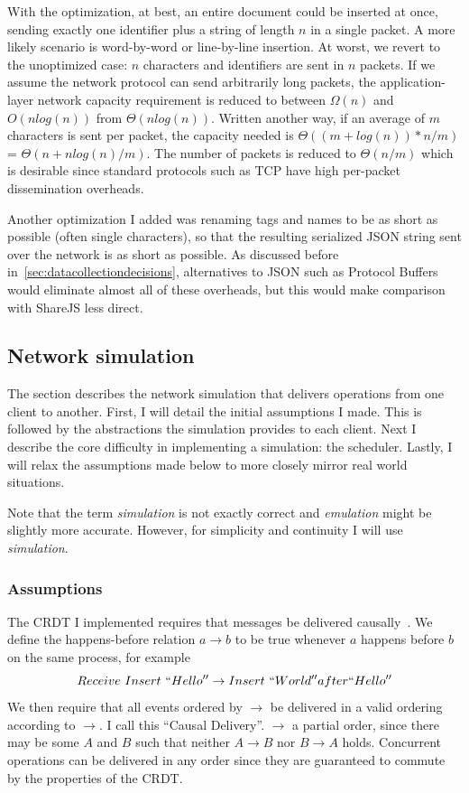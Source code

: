 \documentclass[12pt,a4paper,twoside,openright]{report}
\begin{document}
			With the optimization, at best, an entire document could be inserted at once, sending exactly one identifier plus a string of length $n$ in a single packet. A more likely scenario is word-by-word or line-by-line insertion. At worst, we revert to the unoptimized case: $n$ characters and identifiers are sent in $n$ packets. If we assume the network protocol can send arbitrarily long packets, the application-layer network capacity requirement is reduced to between $\Omega (n)$ and $O(nlog(n))$ from $\Theta(nlog(n))$. Written another way, if an average of $m$ characters is sent per packet, the capacity needed is $\Theta ((m+log(n)) * n/m)$ = $\Theta (n + nlog(n)/m)$. The number of packets is reduced to $\Theta (n/m)$ which is desirable since standard protocols such as TCP have high per-packet dissemination overheads.
			
			Another optimization I added was renaming tags and names to be as short as possible (often single characters), so that the resulting serialized JSON string sent over the network is as short as possible. As discussed before in~\cref{sec:datacollectiondecisions}, alternatives to JSON such as Protocol Buffers would eliminate almost all of these overheads, but this would make comparison with ShareJS less direct.
	
	\subsection{Network simulation}
	
		The section describes the network simulation that delivers operations from one client to another. First, I will detail the initial assumptions I made. This is followed by the abstractions the simulation provides to each client. Next I describe the core difficulty in implementing a simulation: the scheduler. Lastly, I will relax the assumptions made below to more closely mirror real world situations.
		
		Note that the term \textit{simulation} is not exactly correct and \textit{emulation} might be slightly more accurate. However, for simplicity and continuity I will use \textit{simulation}.
		
		\subsubsection{Assumptions} \label{sec:networkassumptions}
		The CRDT I implemented requires that messages be delivered causally~\cite{concdistsystems}. We define the happens-before relation \(a \rightarrow b\) to be true whenever $a$ happens before $b$ on the same process, for example \[Receive\ Insert\ ``Hello'' \rightarrow Insert\ `` World'' after ``Hello''\]
		We then require that all events ordered by $\rightarrow$ be delivered in a valid ordering according to $\rightarrow$. I call this ``Causal Delivery''. $\rightarrow$ a partial order, since there may be some $A$ and $B$ such that neither $A \rightarrow B$ nor $B \rightarrow A$ holds. Concurrent operations can be delivered in any order since they are guaranteed to commute by the properties of the CRDT.
		
\end{document}
